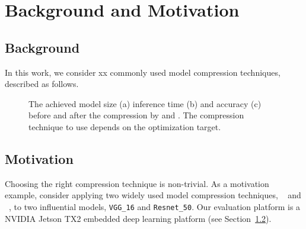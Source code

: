 
\section{Background and Motivation}
\subsection{Background}
In this work, we consider xx commonly used model compression techniques, described as follows.




\begin{figure}[!t]
\centering
{}
\hfill
{}
\hfill
{}
\caption{The achieved model size (a) inference time (b) and accuracy (c) before and after the compression by \quantization and \pruning.
The compression technique to use depends on the optimization target.}
\label{fig:motivation}
\end{figure}

\subsection{Motivation}
Choosing the right compression technique is non-trivial. As a motivation example, consider applying two widely used model compression
techniques, \pruning~\cite{manessi2017automated} and \dquantization~\cite{}, to two influential \CNN models, \texttt{VGG\_16} 	and
\texttt{Resnet\_50}. Our evaluation platform is a NVIDIA Jetson TX2 embedded deep learning platform (see Section~\ref{}).


